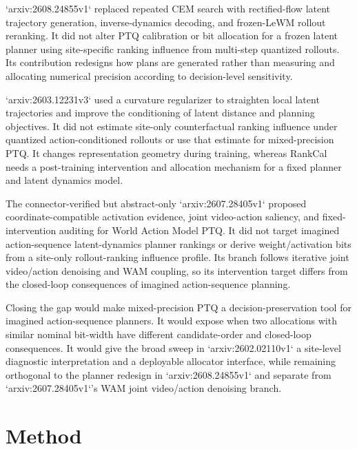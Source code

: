 \documentclass[10pt,a4paper]{article}
\begin{document}
`arxiv:2608.24855v1` replaced repeated CEM search with rectified-flow latent trajectory generation, inverse-dynamics decoding, and frozen-LeWM rollout reranking. It did not alter PTQ calibration or bit allocation for a frozen latent planner using site-specific ranking influence from multi-step quantized rollouts. Its contribution redesigns how plans are generated rather than measuring and allocating numerical precision according to decision-level sensitivity.

`arxiv:2603.12231v3` used a curvature regularizer to straighten local latent trajectories and improve the conditioning of latent distance and planning objectives. It did not estimate site-only counterfactual ranking influence under quantized action-conditioned rollouts or use that estimate for mixed-precision PTQ. It changes representation geometry during training, whereas RankCal needs a post-training intervention and allocation mechanism for a fixed planner and latent dynamics model.

The connector-verified but abstract-only `arxiv:2607.28405v1` proposed coordinate-compatible activation evidence, joint video-action saliency, and fixed-intervention auditing for World Action Model PTQ. It did not target imagined action-sequence latent-dynamics planner rankings or derive weight/activation bits from a site-only rollout-ranking influence profile. Its branch follows iterative joint video/action denoising and WAM coupling, so its intervention target differs from the closed-loop consequences of imagined action-sequence planning.

Closing the gap would make mixed-precision PTQ a decision-preservation tool for imagined action-sequence planners. It would expose when two allocations with similar nominal bit-width have different candidate-order and closed-loop consequences. It would give the broad sweep in `arxiv:2602.02110v1` a site-level diagnostic interpretation and a deployable allocator interface, while remaining orthogonal to the planner redesign in `arxiv:2608.24855v1` and separate from `arxiv:2607.28405v1`'s WAM joint video/action denoising branch.
\section*{Method}
\end{document}
